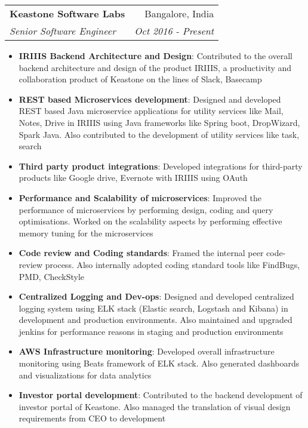 \documentclass[letterpaper,11pt]{article}
\makeatletter
\newcommand{\resumeItem}[2]{
  \item\small{
    \textbf{#1}{: #2 \vspace{-2pt}}
  }
}
\newcommand{\resumeSubheading}[4]{
  \vspace{-1pt}\item
    \begin{tabular*}{0.97\textwidth}{l@{\extracolsep{\fill}}r}
      \textbf{#1} & #2 \\
      \textit{\small#3} & \textit{\small #4} \\
    \end{tabular*}\vspace{-5pt}
}
\newcommand{\resumeItemListStart}{\begin{itemize}}
\newcommand{\resumeItemListEnd}{\end{itemize}\vspace{-5pt}}
\makeatother
\begin{document}
    \resumeSubheading
      {Keastone Software Labs }{Bangalore, India}
      {Senior Software Engineer}{Oct 2016 - Present}
      \resumeItemListStart
          \resumeItem{IRIIIS Backend Architecture and Design}
          {Contributed to the overall backend architecture and design of the product IRIIIS, a productivity and collaboration product of Keastone on the lines of Slack, Basecamp }
          \resumeItem{REST based Microservices development}
          {Designed and developed REST based Java microservice applications for utility services like Mail, Notes, Drive in IRIIIS using Java frameworks like Spring boot, DropWizard, Spark Java. Also contributed to the development of utility services like task, search }
          \resumeItem{Third party product integrations}
          {Developed integrations for third-party products like Google drive, Evernote with IRIIIS using OAuth}
          \resumeItem{Performance and Scalability of microservices}
          {Improved the performance of microservices by performing design, coding and query optimisations. Worked on the scalability aspects by performing effective memory tuning for the microservices}
          \resumeItem{Code review and Coding standards}
          {Framed the internal peer code-review process. Also internally adopted coding standard tools like FindBugs, PMD, CheckStyle}
           \resumeItem{Centralized Logging and Dev-ops}
          {Designed and developed centralized logging system using ELK stack (Elastic search, Logstash and Kibana) in development and production environments. Also maintained and upgraded jenkins for performance reasons in staging and production environments}
           \resumeItem{AWS Infrastructure monitoring}
          {Developed overall infrastructure monitoring using Beats framework of ELK stack. Also generated dashboards and visualizations for data analytics}
           \resumeItem{Investor portal development}
          {Contributed to the backend development of investor portal of Keastone. Also managed the translation of visual design requirements from CEO to development}
      \resumeItemListEnd
\end{document}
